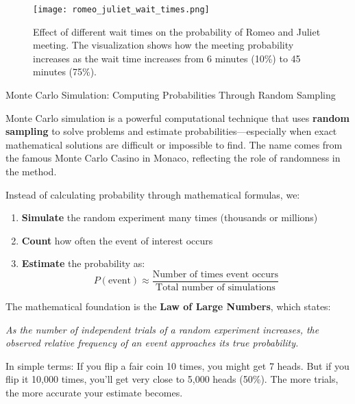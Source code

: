 \begin{itemize}
\begin{figure}[H]
    \centering
    \texttt{[image: romeo\_juliet\_wait\_times.png]}
    \caption{Effect of different wait times on the probability of Romeo and Juliet meeting. The visualization shows how the meeting probability increases as the wait time increases from 6 minutes (10\%) to 45 minutes (75\%).}
    \label{fig:romeo_juliet_wait_times}
\end{figure}

\begin{keyconceptboxbreak}{Monte Carlo Simulation: Computing Probabilities Through Random Sampling}


Monte Carlo simulation is a powerful computational technique that uses \textbf{random sampling} to solve problems and estimate probabilities—especially when exact mathematical solutions are difficult or impossible to find. The name comes from the famous Monte Carlo Casino in Monaco, reflecting the role of randomness in the method.


Instead of calculating probability through mathematical formulas, we:
\begin{enumerate}
    \item \textbf{Simulate} the random experiment many times (thousands or millions)
    \item \textbf{Count} how often the event of interest occurs
    \item \textbf{Estimate} the probability as:
    \[
    P(\text{event}) \approx \frac{\text{Number of times event occurs}}{\text{Total number of simulations}}
    \]
\end{enumerate}


The mathematical foundation is the \textbf{Law of Large Numbers}, which states:

\textit{As the number of independent trials of a random experiment increases, the observed relative frequency of an event approaches its true probability.}

In simple terms: If you flip a fair coin 10 times, you might get 7 heads. But if you flip it 10,000 times, you'll get very close to 5,000 heads (50\%). The more trials, the more accurate your estimate becomes.



\end{keyconceptboxbreak}
\end{itemize}
